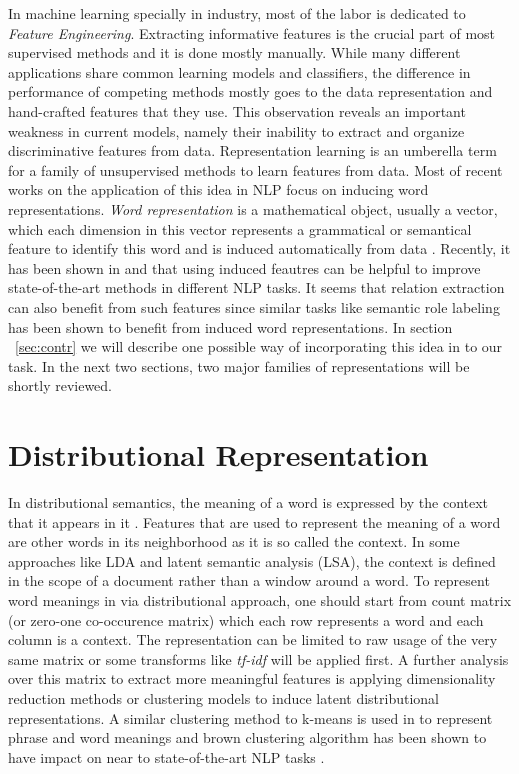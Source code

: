 \documentclass[12pt]{report}
\begin{document}
In machine learning specially in industry, most of the labor is dedicated to
\emph{Feature Engineering}. Extracting informative features is the crucial part
of most supervised methods and it is done mostly manually. While many different
applications share common learning models and classifiers, the difference in
performance of competing methods mostly goes to the data representation and
hand-crafted features that they use. This observation reveals an important
weakness in current models, namely their inability to extract and organize
discriminative features from data. Representation learning is an umberella term
for a family of unsupervised methods to learn features from data. Most of recent
works on the application of this idea in NLP focus on inducing word
representations. \emph{Word representation} is a mathematical object, usually a
vector, which each dimension in this vector represents a grammatical or
semantical feature to identify this word and is induced automatically from data
\cite{Turian2010b}. Recently, it has been shown in \cite{Turian2010b} and \cite{Collobert2011} that using
 induced feautres can be helpful to improve state-of-the-art methods in 
different NLP tasks. It seems that relation extraction can also benefit from such features since similar tasks like 
semantic role labeling has been shown to benefit from
induced word representations. In section ~\ref{sec:contr} we will describe one
possible way of incorporating this idea in to our task. In the next two sections, two major
families of representations will be shortly reviewed.


\section{Distributional Representation}
\label{sec:distl-repr}
In distributional semantics, the meaning of a word is expressed by the context
that it appears in it \cite{Harris1981}. Features that are used to represent the
meaning of a word are other words in its neighborhood as it is so called the
context. In some approaches like LDA and latent semantic analysis (LSA), 
the context is defined in the scope of a document rather than a window around a
word. To represent word meanings in via distributional approach, one should
start from count matrix (or zero-one co-occurence matrix) which each row
represents a word and each column is a context. The representation can be
limited to raw usage of the very same matrix or some transforms like
\emph{tf-idf} will be applied first. A further analysis over this matrix to
extract more meaningful features is applying dimensionality reduction methods or
clustering models to induce latent distributional representations. A similar
clustering method to k-means is used in \cite{Lin2009} to represent phrase and
word meanings and brown clustering algorithm \cite{Brown1992} has been shown to
have impact on near to state-of-the-art NLP tasks \cite{Turian2010b}. 
\end{document}
